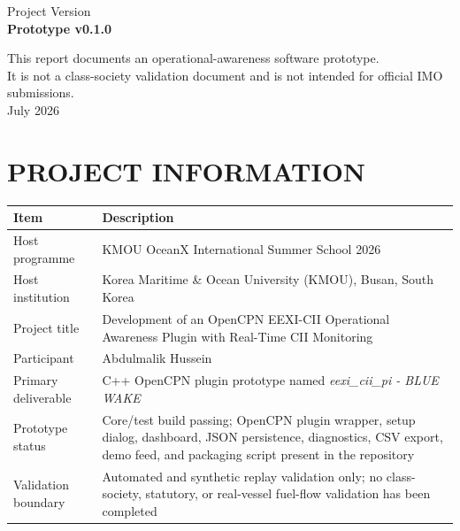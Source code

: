 \documentclass[12pt, a4paper]{report}
\begin{document}
\begin{titlepage}
\begin{center}
{{\normalsize Project Version}\\[0.2cm]
{\large \textbf{Prototype v0.1.0}}\\

\vfill

{\footnotesize This report documents an operational-awareness software prototype.}\\
{\footnotesize It is not a class-society validation document and is not intended for official IMO submissions.}\\[0.2cm]
{\footnotesize July 2026}
}

\end{center}
\end{titlepage}
\hypersetup{pageanchor=true}


\section*{PROJECT INFORMATION}

\begin{tabularx}{\textwidth}{lX}
\toprule
\textbf{Item} & \textbf{Description} \\
\midrule
Host programme & KMOU OceanX International Summer School 2026 \cite{kmouOceanX2026} \\
Host institution & Korea Maritime \& Ocean University (KMOU), Busan, South Korea \\
Project title & Development of an OpenCPN EEXI-CII Operational Awareness Plugin with Real-Time CII Monitoring \\
Participant & Abdulmalik Hussein \\
Primary deliverable & C++ OpenCPN plugin prototype named \textit{eexi\_cii\_pi - BLUE WAKE} \\
Prototype status & Core/test build passing; OpenCPN plugin wrapper, setup dialog, dashboard, JSON persistence, diagnostics, CSV export, demo feed, and packaging script present in the repository \\
Validation boundary & Automated and synthetic replay validation only; no class-society, statutory, or real-vessel fuel-flow validation has been completed \\
\bottomrule
\end{tabularx}
\end{document}
